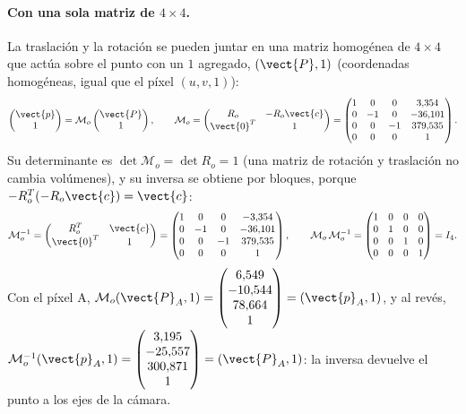 \paragraph{Con una sola matriz de $4\times4$.} La traslación y la rotación se pueden juntar en una matriz homogénea de $4\times4$ que actúa sobre
el punto con un $1$ agregado, $(\vect{P},1)$ (coordenadas homogéneas, igual que el píxel $(u,v,1)$):
\begin{equation}
\begin{pmatrix}\vect{p}\\1\end{pmatrix}=\mathcal{M}_o\begin{pmatrix}\vect{P}\\1\end{pmatrix},\qquad
\mathcal{M}_o=\begin{pmatrix}R_o&-R_o\vect{c}\\\vect{0}^{T}&1\end{pmatrix}=\begin{pmatrix} 1 & 0 & 0 & 3{,}354 \\ 0 & -1 & 0 & -36{,}101 \\ 0 & 0 & -1 & 379{,}535 \\ 0 & 0 & 0 & 1 \end{pmatrix} .
\end{equation}
Su determinante es $\det\mathcal{M}_o=\det R_o=1$ (una matriz de rotación y traslación no cambia volúmenes), y su inversa se obtiene por bloques,
porque $-R_o^{T}(-R_o\vect{c})=\vect{c}$:
\begin{equation}
\mathcal{M}_o^{-1}=\begin{pmatrix}R_o^{T}&\vect{c}\\\vect{0}^{T}&1\end{pmatrix}=\begin{pmatrix} 1 & 0 & 0 & -3{,}354 \\ 0 & -1 & 0 & -36{,}101 \\ 0 & 0 & -1 & 379{,}535 \\ 0 & 0 & 0 & 1 \end{pmatrix},\qquad
\mathcal{M}_o\,\mathcal{M}_o^{-1}=\begin{pmatrix} 1 & 0 & 0 & 0 \\ 0 & 1 & 0 & 0 \\ 0 & 0 & 1 & 0 \\ 0 & 0 & 0 & 1 \end{pmatrix}=I_4 .
\end{equation}
Con el píxel A, $\mathcal{M}_o(\vect{P}_A,1)=\begin{pmatrix} 6{,}549 \\ -10{,}544 \\ 78{,}664 \\ 1 \end{pmatrix}=(\vect{p}_A,1)$, y al revés, $\mathcal{M}_o^{-1}(\vect{p}_A,1)=\begin{pmatrix} 3{,}195 \\ -25{,}557 \\ 300{,}871 \\ 1 \end{pmatrix}=(\vect{P}_A,1)$: la inversa
devuelve el punto a los ejes de la cámara.

